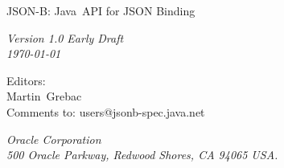 \begin{titlepage}
\raggedleft

\vspace*{60pt}

{\Huge
\textsf{JSON-B: Java\texttrademark\ API for JSON Binding}}

\vspace{20pt}

{
\Large\textit{Version 1.0 Early Draft\\
\today}\\
}

\vspace{40pt}

{\large Editors:\\
Martin\ Grebac\\
\vspace{10pt}Comments to: users@jsonb-spec.java.net
}

\vspace{80pt}

{\small\textit{Oracle Corporation\\
500 Oracle Parkway, Redwood Shores, CA 94065 USA.}
}
\end{titlepage} 
